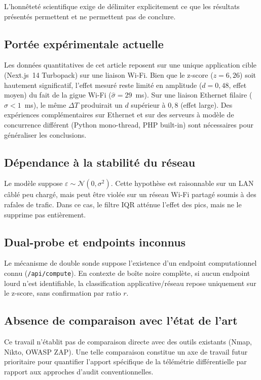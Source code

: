 \documentclass[10pt,conference,compsoc]{IEEEtran}
\begin{document}
L'honnêteté scientifique exige de délimiter explicitement ce que les
résultats présentés permettent et ne permettent pas de conclure.

\subsection{Portée expérimentale actuelle}
Les données quantitatives de cet article reposent sur une unique
application cible (Next.js~14 Turbopack) sur une liaison Wi-Fi. Bien
que le z-score ($z = 6{,}26$) soit hautement significatif, l'effet
mesuré reste limité en amplitude ($d = 0{,}48$, effet moyen) du fait
de la gigue Wi-Fi ($\hat{\sigma} = 29$~ms). Sur une liaison Ethernet
filaire ($\hat{\sigma} < 1$~ms), le même $\Delta T$ produirait un $d$
supérieur à $0{,}8$ (effet large). Des expériences complémentaires sur
Ethernet et sur des serveurs à modèle de concurrence différent
(Python mono-thread, PHP built-in) sont nécessaires pour généraliser
les conclusions.

\subsection{Dépendance à la stabilité du réseau}
Le modèle suppose $\varepsilon \sim \mathcal{N}(0, \sigma^2)$. Cette
hypothèse est raisonnable sur un LAN câblé peu chargé, mais peut être
violée sur un réseau Wi-Fi partagé soumis à des rafales de trafic.
Dans ce cas, le filtre IQR atténue l'effet des pics, mais ne le
supprime pas entièrement.

\subsection{Dual-probe et endpoints inconnus}
Le mécanisme de double sonde suppose l'existence d'un endpoint
computationnel connu (\texttt{/api/compute}). En contexte de boîte
noire complète, si aucun endpoint lourd n'est identifiable, la
classification applicative/réseau repose uniquement sur le z-score,
sans confirmation par ratio $r$.

\subsection{Absence de comparaison avec l'état de l'art}
Ce travail n'établit pas de comparaison directe avec des outils
existants (Nmap, Nikto, OWASP ZAP). Une telle comparaison constitue
un axe de travail futur prioritaire pour quantifier l'apport spécifique
de la télémétrie différentielle par rapport aux approches d'audit
conventionnelles.
\end{document}
